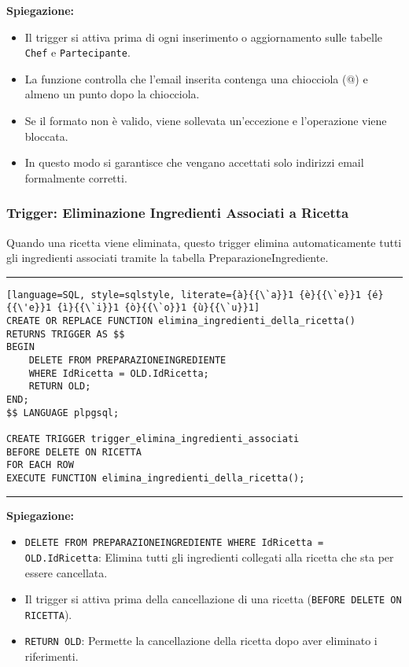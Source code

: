 \textbf{Spiegazione:}
\begin{itemize}
    \item Il trigger si attiva prima di ogni inserimento o aggiornamento sulle tabelle \texttt{Chef} e \texttt{Partecipante}.
    \item La funzione controlla che l'email inserita contenga una chiocciola (@) e almeno un punto dopo la chiocciola.
    \item Se il formato non è valido, viene sollevata un'eccezione e l'operazione viene bloccata.
    \item In questo modo si garantisce che vengano accettati solo indirizzi email formalmente corretti.
\end{itemize}

\subsubsection{Trigger: Eliminazione Ingredienti Associati a Ricetta}

Quando una ricetta viene eliminata, questo trigger elimina automaticamente tutti gli ingredienti associati tramite la tabella PreparazioneIngrediente.

\noindent\rule{\textwidth}{0.4pt}
\begin{lstlisting}[language=SQL, style=sqlstyle, literate={à}{{\`a}}1 {è}{{\`e}}1 {é}{{\'e}}1 {ì}{{\`i}}1 {ò}{{\`o}}1 {ù}{{\`u}}1]
CREATE OR REPLACE FUNCTION elimina_ingredienti_della_ricetta()
RETURNS TRIGGER AS $$
BEGIN
    DELETE FROM PREPARAZIONEINGREDIENTE
    WHERE IdRicetta = OLD.IdRicetta;
    RETURN OLD;
END;
$$ LANGUAGE plpgsql;

CREATE TRIGGER trigger_elimina_ingredienti_associati
BEFORE DELETE ON RICETTA
FOR EACH ROW
EXECUTE FUNCTION elimina_ingredienti_della_ricetta();
\end{lstlisting}
\noindent\rule{\textwidth}{0.4pt}

\textbf{Spiegazione:}
\begin{itemize}
    \item \texttt{DELETE FROM PREPARAZIONEINGREDIENTE WHERE IdRicetta = OLD.IdRicetta}: Elimina tutti gli ingredienti collegati alla ricetta che sta per essere cancellata.
    \item Il trigger si attiva prima della cancellazione di una ricetta (\texttt{BEFORE DELETE ON RICETTA}).
    \item \texttt{RETURN OLD}: Permette la cancellazione della ricetta dopo aver eliminato i riferimenti.
\end{itemize}

